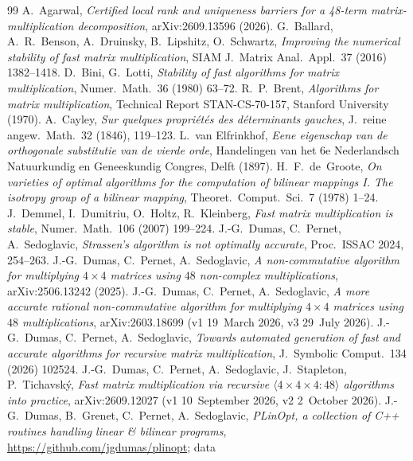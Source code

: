 \documentclass[11pt]{article}
\theoremstyle{remark}
\begin{document}
{\small
\begin{thebibliography}{99}
 A.~Agarwal, \emph{Certified local rank and
uniqueness barriers for a 48-term matrix-multiplication decomposition},
arXiv:2609.13596 (2026).
 G.~Ballard, A.~R.~Benson, A.~Druinsky, B.~Lipshitz,
O.~Schwartz, \emph{Improving the numerical stability of fast matrix
multiplication}, SIAM J.\ Matrix Anal.\ Appl.\ 37 (2016) 1382--1418.
 D.~Bini, G.~Lotti, \emph{Stability of fast algorithms for
matrix multiplication}, Numer.\ Math.\ 36 (1980) 63--72.
 R.~P.~Brent, \emph{Algorithms for matrix
multiplication}, Technical Report STAN-CS-70-157, Stanford University
(1970).
 A.~Cayley, \emph{Sur quelques propri\'et\'es des
d\'eterminants gauches}, J.\ reine angew.\ Math.\ 32 (1846), 119--123.
 L.~van Elfrinkhof, \emph{Eene eigenschap
van de orthogonale substitutie van de vierde orde}, Handelingen van het
6e Nederlandsch Natuurkundig en Geneeskundig Congres, Delft (1897).
 H.~F.~de~Groote, \emph{On varieties of optimal
algorithms for the computation of bilinear mappings I. The isotropy
group of a bilinear mapping}, Theoret.\ Comput.\ Sci.\ 7 (1978) 1--24.
 J.~Demmel, I.~Dumitriu, O.~Holtz, R.~Kleinberg,
\emph{Fast matrix multiplication is stable}, Numer.\ Math.\ 106 (2007)
199--224.
 J.-G.~Dumas, C.~Pernet, A.~Sedoglavic, \emph{Strassen's
algorithm is not optimally accurate}, Proc.\ ISSAC 2024, 254--263.
 J.-G.~Dumas, C.~Pernet, A.~Sedoglavic, \emph{A
non-commutative algorithm for multiplying $4\times4$ matrices using
$48$ non-complex multiplications}, arXiv:2506.13242 (2025).
 J.-G.~Dumas, C.~Pernet, A.~Sedoglavic, \emph{A more
accurate rational non-commutative algorithm for multiplying $4\times4$
matrices using $48$ multiplications}, arXiv:2603.18699 (v1 19~March
2026, v3 29~July 2026).
 J.-G.~Dumas, C.~Pernet, A.~Sedoglavic, \emph{Towards
automated generation of fast and accurate algorithms for recursive
matrix multiplication}, J.\ Symbolic Comput.\ 134 (2026) 102524.
 J.-G.~Dumas, C.~Pernet, A.~Sedoglavic, J.~Stapleton,
P.~Tichavsk\'y, \emph{Fast matrix multiplication via recursive
$\langle4\times4\times4:48\rangle$ algorithms into practice},
arXiv:2609.12027 (v1 10~September 2026, v2 2~October 2026).
 J.-G.~Dumas, B.~Grenet, C.~Pernet, A.~Sedoglavic,
\emph{PLinOpt, a collection of C++ routines handling linear \&
bilinear programs}, \url{https://github.com/jgdumas/plinopt}; data

\end{thebibliography}}
\end{document}
